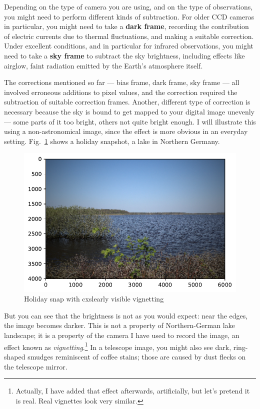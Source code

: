 \documentclass[twocolumn,apj]{openjournal}
\begin{document}
Depending on the type of camera you are using, and on the type of observations, you might need to perform different kinds of subtraction. For older CCD cameras in particular, you might need to take a {\bf dark frame}, recording the contribution of electric currents due to thermal fluctuations, and making a suitable correction. Under excellent conditions, and in particular for infrared observations, you might need to take a {\bf sky frame} to subtract the sky brightness, including effects like airglow, faint radiation emitted by the Earth's atmosphere itself. 

The corrections mentioned so far --- bias frame, dark frame, sky frame --- all involved erroneous additions to pixel values, and the correction required the subtraction of suitable correction frames. Another, different type of correction is necessary because the sky is bound to get mapped to your digital image unevenly --- some parts of it too bright, others not quite bright enough. I will illustrate this using a non-astronomical image, since the effect is more obvious in an everyday setting. Fig.~\ref{SampleVignette} shows a holiday snapshot, a lake in Northern Germany. 
\begin{figure}[htbp]
\begin{center}
\includegraphics[width=0.9\linewidth]{flatfield-landscape-raw.pdf}
\caption{Holiday snap with cxslearly visible vignetting}
\label{SampleVignette}
\end{center}
\end{figure}

But you can see that the brightness is not as you would expect: near the edges, the image becomes darker. This is not a property of Northern-German lake landscape; it is a property of the camera I have used to record the image, an effect known as {\em vignetting}.\footnote{Actually, I have added that effect afterwards, artificially, but let's pretend it is real. Real vignettes look very similar.} In a telescope image, you might also see dark, ring-shaped smudges reminiscent of coffee stains; those are caused by dust flecks on the telescope mirror.
\end{document}
